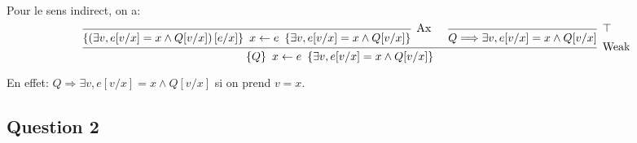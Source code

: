 \documentclass{cours}
\begin{document}
Pour le sens indirect, on a: 
\begin{equation*}
	\begin{prooftree}
		\infer0[Ax]{\hoare{\left(\exists v, e[v/x] = x \land Q[v/x]\right)[e/x]}{x \gets e}{\exists v, e[v/x] = x \land Q[v/x]}}
		\infer0[$\top$]{Q \Longrightarrow \exists v, e[v/x] = x \land Q[v/x]}
		\infer2[Weak]{\hoare{Q}{x\gets e}{\exists v, e[v/x] = x \land Q[v/x]}}
	\end{prooftree}
\end{equation*}

En effet: $Q \Longrightarrow \exists v, e[v/x] = x \land Q[v/x]$ si on prend $v = x$.

\subsection{Question 2}
\end{document}
